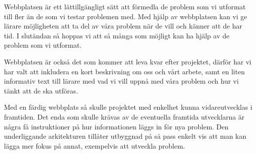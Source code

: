 \textcolor{Mahogany}{Webbplatsen är ett lättillgängligt sätt att förmedla de problem som vi utformat till fler än de som vi testar problemen med. Med hjälp av webbplatsen kan vi ge lärare möjligheten att ta del av våra problem när de vill och känner att de har tid.
I slutändan så hoppas vi att så många som möjligt kan ha hjälp av de problem som vi utformat.}

\textcolor{Mahogany}{Webbplatsen är också det som kommer att leva kvar efter projektet, därför har vi har valt att inkludera en kort beskrivning om oss och vårt arbete, samt en liten informativ text till lärare med vad vi vill uppnå med våra problem och hur vi tänkt att de ska utföras.}

\textcolor{WildStrawberry}{
    Med en färdig webbplats så skulle projektet med enkelhet kunna vidareutvecklas i framtiden. Det enda som skulle krävas av de eventuella framtida utvecklarna är några få instruktioner på hur informationen läggs in för nya problem. Den underliggande arkitekturen tillåter utbyggnad på så pass enkelt vis att man kan lägga mer fokus på annat, exempelvis att utveckla problem.
    }